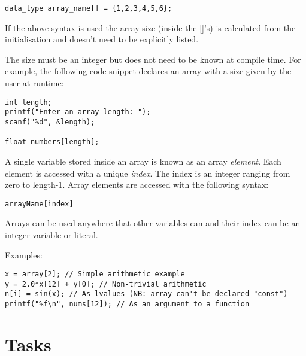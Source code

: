 \documentclass{lab}
\begin{document}
\begin{lstlisting}[style=Ctable]
data_type array_name[] = {1,2,3,4,5,6};
\end{lstlisting}

If the above syntax is used the array size (inside the []'s) is calculated from the initialisation and doesn't need to be explicitly listed.

The size must be an integer but does not need to be known at compile time. For example, the following code snippet declares an array with a size given by the user at runtime:

\begin{lstlisting}[style=CStyle]
int length;
printf("Enter an array length: ");
scanf("%d", &length);

float numbers[length];
\end{lstlisting}

A single variable stored inside an array is known as an array \textit{element}. Each element is accessed with a unique \textit{index}. The index is an integer ranging from zero to length-1. Array elements are accessed with the following syntax:

\begin{lstlisting}[style=Ctable]
arrayName[index]
\end{lstlisting}

Arrays can be used anywhere that other variables can and their index can be an integer variable or literal.

Examples:
\begin{lstlisting}[style=Ctable]
x = array[2]; // Simple arithmetic example
y = 2.0*x[12] + y[0]; // Non-trivial arithmetic
n[i] = sin(x); // As lvalues (NB: array can't be declared "const")
printf("%f\n", nums[12]); // As an argument to a function
\end{lstlisting}

\pagebreak
\section{Tasks}
\end{document}
